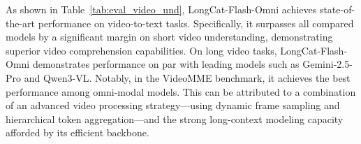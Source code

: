 \documentclass{article}
\begin{document}
As shown in Table~\ref{tab:eval_video_und}, LongCat-Flash-Omni achieves state-of-the-art performance on video-to-text tasks. Specifically, it surpasses all compared models by a significant margin on short video understanding, demonstrating superior video comprehension capabilities. On long video tasks, LongCat-Flash-Omni demonstrates performance on par with leading models such as Gemini-2.5-Pro and Qwen3-VL. Notably, in the VideoMME benchmark, it achieves the best performance among omni-modal models. This can be attributed to a combination of an advanced video processing strategy—using dynamic frame sampling and hierarchical token aggregation—and the strong long-context modeling capacity afforded by its efficient backbone.
\end{document}
